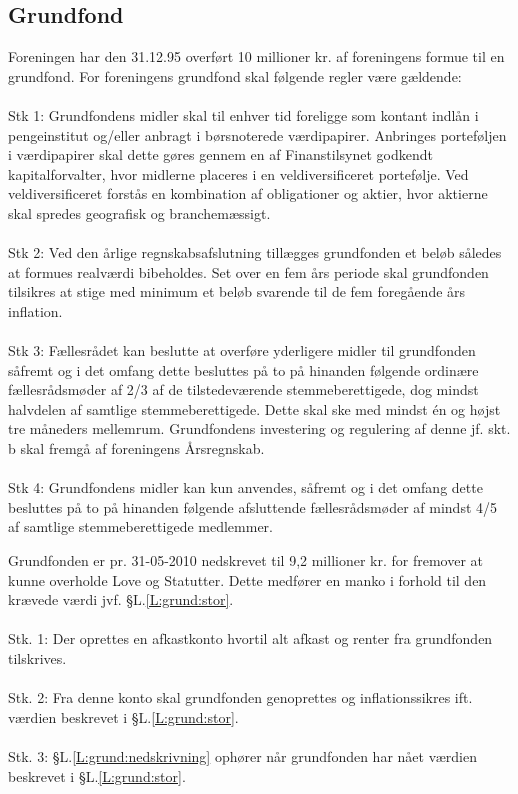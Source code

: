 \begin{list}
\subsection{Grundfond}
\label{kapL:grundfond}
\item \label{L:grund:stor} Foreningen har den 31.12.95 overført 10 millioner kr. af foreningens formue til en grundfond.
For foreningens grundfond skal følgende regler være gældende:
\\
\\Stk 1: Grundfondens midler skal til enhver tid foreligge som kontant indlån i pengeinstitut og/eller anbragt i børsnoterede værdipapirer. Anbringes porteføljen i værdipapirer skal dette gøres gennem en af Finanstilsynet godkendt kapitalforvalter, hvor midlerne placeres i en veldiversificeret portefølje. Ved veldiversificeret forstås en kombination af obligationer og aktier, hvor aktierne skal spredes geografisk og branchemæssigt.
\\
\\Stk 2: Ved den årlige regnskabsafslutning tillægges grundfonden et beløb således at formues realværdi bibeholdes. Set over en fem års periode skal grundfonden tilsikres at stige med minimum et beløb svarende til de fem foregående års inflation.
\\
\\
Stk 3: Fællesrådet kan beslutte at overføre yderligere midler til grundfonden såfremt og i det omfang dette besluttes på to på hinanden følgende ordinære fællesrådsmøder af 2/3 af de tilstedeværende stemmeberettigede, dog mindst halvdelen af samtlige stemmeberettigede. Dette skal ske med mindst én og højst tre måneders mellemrum. Grundfondens investering og regulering af denne jf. skt. b skal fremgå af foreningens Årsregnskab.
\\
\\
Stk 4: Grundfondens midler kan kun anvendes, såfremt og i det omfang dette besluttes på to på hinanden følgende afsluttende fællesrådsmøder af mindst 4/5 af samtlige stemmeberettigede medlemmer. 

\item \label{L:grund:nedskrivning} Grundfonden er pr. 31-05-2010 nedskrevet til 9,2 millioner kr. for fremover at kunne overholde Love og
Statutter. Dette medfører en manko i forhold til den krævede værdi jvf. §L.\ref{L:grund:stor}.
\\
\\
Stk. 1: Der oprettes en afkastkonto hvortil alt afkast og renter fra grundfonden tilskrives.
\\
\\
Stk. 2: Fra denne konto skal grundfonden genoprettes og inflationssikres ift. værdien beskrevet i §L.\ref{L:grund:stor}.
\\
\\
Stk. 3: §L.\ref{L:grund:nedskrivning} ophører når grundfonden har nået værdien beskrevet i §L.\ref{L:grund:stor}.




\end{list}
